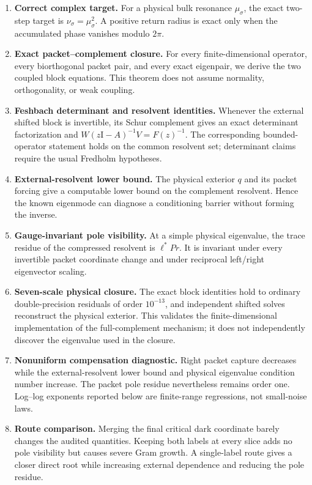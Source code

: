 \documentclass[11pt]{article}
\theoremstyle{definition}
\theoremstyle{remark}
\newcommand{\Id}{\mathrm I}
\begin{document}
\begin{enumerate}[label=\textbf{F\arabic*.},leftmargin=3.2em]
 \item \textbf{Correct complex target.}
 For a physical bulk resonance $\mu_\sigma$, the exact two-step target is
 $\nu_\sigma=\mu_\sigma^2$.  A positive return radius is exact only when
 the accumulated phase vanishes modulo $2\pi$.

 \item \textbf{Exact packet--complement closure.}
 For every finite-dimensional operator, every biorthogonal packet pair,
 and every exact eigenpair, we derive the two coupled block equations.
 This theorem does not assume normality, orthogonality, or weak coupling.

 \item \textbf{Feshbach determinant and resolvent identities.}
 Whenever the external shifted block is invertible, its Schur complement
 gives an exact determinant factorization and
 $W(z\Id-A)^{-1}V=F(z)^{-1}$.  The corresponding bounded-operator statement
 holds on the common resolvent set; determinant claims require the usual
 Fredholm hypotheses.

 \item \textbf{External-resolvent lower bound.}
 The physical exterior $q$ and its packet forcing give a computable lower
 bound on the complement resolvent.  Hence the known eigenmode can diagnose
 a conditioning barrier without forming the inverse.

 \item \textbf{Gauge-invariant pole visibility.}
 At a simple physical eigenvalue, the trace residue of the compressed
 resolvent is $\ell^*Pr$.  It is invariant under every invertible packet
 coordinate change and under reciprocal left/right eigenvector scaling.

 \item \textbf{Seven-scale physical closure.}
 The exact block identities hold to ordinary double-precision residuals of
 order $10^{-13}$, and independent shifted solves reconstruct the physical
 exterior.  This validates the finite-dimensional implementation of the
 full-complement mechanism; it does not independently discover the
 eigenvalue used in the closure.

 \item \textbf{Nonuniform compensation diagnostic.}
 Right packet capture decreases while the external-resolvent lower bound
 and physical eigenvalue condition number increase.  The packet pole
 residue nevertheless remains order one.  Log--log exponents reported
 below are finite-range regressions, not small-noise laws.

 \item \textbf{Route comparison.}
 Merging the final critical dark coordinate barely changes the audited
 quantities.  Keeping both labels at every slice adds no pole visibility
 but causes severe Gram growth.  A single-label route gives a closer direct
 root while increasing external dependence and reducing the pole residue.
\end{enumerate}
\end{document}
